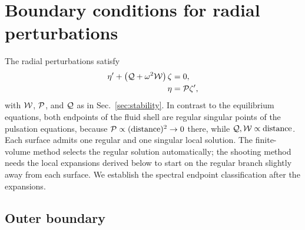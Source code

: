 \documentclass[%
 reprint,
 amsmath,amssymb,
 aps,prd,
 superscriptaddress,
]{revtex4-2}
\begin{document}
\appendix

\section{Boundary conditions for radial perturbations}
\label{app:bc}

The radial perturbations satisfy
\begin{align}
    \eta' + \left({\cal Q}+\omega^2{\cal W}\right)\zeta &=0,
    \label{eq:pert_eta}\\
    \eta &= {\cal P}\zeta',
    \label{eq:pert_zeta}
\end{align}
with ${\cal W}$, ${\cal P}$, and ${\cal Q}$ as in Sec.~\ref{sec:stability}. In contrast to the equilibrium equations, both endpoints of the fluid shell are regular singular points of the pulsation equations, because ${\cal P}\propto(\text{distance})^2\to0$ there, while ${\cal Q},{\cal W}\propto\text{distance}$. Each surface admits one regular and one singular local solution. The finite-volume method selects the regular solution automatically; the shooting method needs the local expansions derived below to start on the regular branch slightly away from each surface. We establish the spectral endpoint classification after the expansions.

\subsection{Outer boundary}
\end{document}

